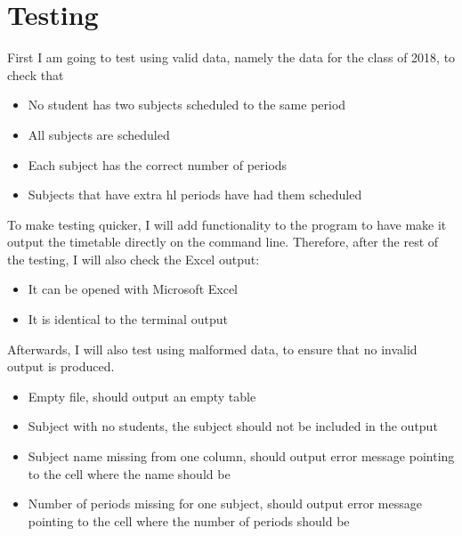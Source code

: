 \documentclass[12pt]{article}
\begin{document}
\section{Testing}

First I am going to test using valid data, namely the data for the class of 2018, to check
that
%
\begin{itemize}
    \item No student has two subjects scheduled to the same period
    \item All subjects are scheduled
    \item Each subject has the correct number of periods
    \item Subjects that have extra hl periods have had them scheduled
\end{itemize}
%

To make testing quicker, I will add functionality to the program to have make it output the
timetable directly on the command line. Therefore, after the rest of the testing, I will
also check the Excel output:
%
\begin{itemize}
    \item It can be opened with Microsoft Excel
    \item It is identical to the terminal output
\end{itemize}
%

Afterwards, I will also test using malformed data, to ensure that no invalid output is
produced. 
%
\begin{itemize}
    \item Empty file, should output an empty table
    \item Subject with no students, the subject should not be included in the output
    \item Subject name missing from one column, should output error message pointing to the
        cell where the name should be
    \item Number of periods missing for one subject, should output error message pointing to
        the cell where the number of periods should be
\end{itemize}
%
\end{document}
